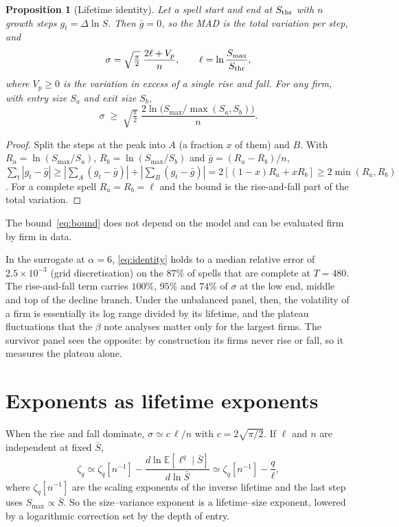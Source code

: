 \documentclass[11pt]{article}
\newcommand{\E}{\mathbb E}
\newcommand{\Sthr}{S_{\rm thr}}
\newtheorem{proposition}{Proposition}
\theoremstyle{remark}
\begin{document}
\begin{proposition}[Lifetime identity]\label{prop:identity}
Let a spell start and end at $\Sthr$ with $n$ growth steps $g_t=\Delta\ln S$.  Then $\bar g=0$, so the MAD is
the total variation per step, and
\begin{equation}
  \sigma=\sqrt{\tfrac\pi2}\;\frac{2\ell+V_p}{n},\qquad \ell=\ln\frac{S_{\max}}{\Sthr},
  \label{eq:identity}
\end{equation}
where $V_p\ge0$ is the variation in excess of a single rise and fall.  For any firm, with entry size $S_a$ and
exit size $S_b$,
\begin{equation}
  \sigma\;\ge\;\sqrt{\tfrac\pi2}\;\frac{2\ln\bigl(S_{\max}/\max(S_a,S_b)\bigr)}{n}.
  \label{eq:bound}
\end{equation}
\end{proposition}
\begin{proof}
Split the steps at the peak into $A$ (a fraction $x$ of them) and $B$.  With $R_a=\ln(S_{\max}/S_a)$,
$R_b=\ln(S_{\max}/S_b)$ and $\bar g=(R_a-R_b)/n$,
$\sum_t|g_t-\bar g|\ge|\sum_A(g_t-\bar g)|+|\sum_B(g_t-\bar g)|=2[(1-x)R_a+xR_b]\ge2\min(R_a,R_b)$.  For a
complete spell $R_a=R_b=\ell$ and the bound is the rise-and-fall part of the total variation.
\end{proof}

The bound~\eqref{eq:bound} does not depend on the model and can be evaluated firm by firm in data.

In the surrogate at $\alpha=6$, \eqref{eq:identity} holds to a median relative error of $2.5\times10^{-3}$ (grid
discretisation) on the $87\%$ of spells that are complete at $T=480$.  The rise-and-fall term carries $100\%$,
$95\%$ and $74\%$ of $\sigma$ at the low end, middle and top of the decline branch.  Under the unbalanced panel,
then, the volatility of a firm is essentially its log range divided by its lifetime, and the plateau
fluctuations that the $\beta$ note analyses matter only for the largest firms.  The survivor panel sees the
opposite: by construction its firms never rise or fall, so it measures the plateau alone.

\section{Exponents as lifetime exponents}

When the rise and fall dominate, $\sigma\simeq c\,\ell/n$ with $c=2\sqrt{\pi/2}$.  If $\ell$ and $n$ are
independent at fixed $\bar S$,
\begin{equation}
  \zeta_q\simeq\zeta_q[n^{-1}]-\frac{d\ln\E[\ell^q\mid\bar S]}{d\ln\bar S}
  \simeq\zeta_q[n^{-1}]-\frac{q}{\ell},
  \label{eq:lifetime-rep}
\end{equation}
where $\zeta_q[n^{-1}]$ are the scaling exponents of the inverse lifetime and the last step uses
$S_{\max}\propto\bar S$.  So the size--variance exponent is a lifetime--size exponent, lowered by a logarithmic
correction set by the depth of entry.
\end{document}

